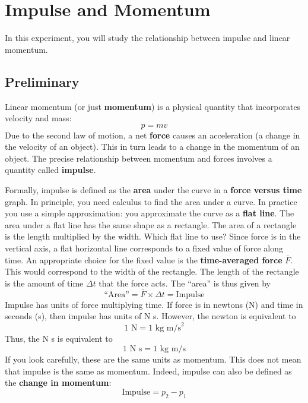 \setcounter{chapter}{8}
\chapter{Impulse and Momentum}
In this experiment, you will study the relationship between impulse and linear momentum.
\section{Preliminary}
Linear momentum (or just \textbf{momentum}) is a physical quantity that incorporates velocity and mass:
\begin{equation}
    p = m v
\end{equation}
Due to the second law of motion, a net \textbf{force} causes an acceleration (a change in the velocity of an object). This in turn leads to a change in the momentum of an object. The precise relationship between momentum and forces involves a quantity called \textbf{impulse}.

Formally, impulse is defined as the \textbf{area} under the curve in a \textbf{force versus time} graph. In principle, you need calculus to find the area under a curve. In practice you use a simple approximation: you approximate the curve as a \textbf{flat line}. The area under a flat line has the same shape as a rectangle. The area of a rectangle is the length multiplied by the width. Which flat line to use? Since force is in the vertical axis, a flat horizontal line corresponds to a fixed value of force along time. An appropriate choice for the fixed value is the \textbf{time-averaged force} $\bar{F}$. This would correspond to the width of the rectangle. The length of the rectangle is the amount of time $\Delta t$ that the force acts. The ``area'' is thus given by
\begin{equation}
    \text{``Area''} = \bar{F} \times \Delta t = \text{Impulse}
\end{equation}
Impulse has units of force multiplying time. If force is in newtons (N) and time in seconds (s), then impulse has units of N s. However, the newton is equivalent to
\begin{equation}
    1 \text{ N} = 1 \text{ kg m/s}^{2}
\end{equation}
Thus, the N s is equivalent to
\begin{equation}
    1 \text{ N s} = 1 \text{ kg m/s}
\end{equation}
If you look carefully, these are the same units as momentum. This does not mean that impulse is the same as momentum. Indeed, impulse can also be defined as the \textbf{change in momentum}:
\begin{equation}
    \text{Impulse} = p_{2} - p_{1}
\end{equation}
